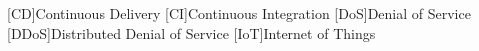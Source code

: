 \begin{acronym}[IEEE]
	[CD]{Continuous Delivery}
	[CI]{Continuous Integration}
	[DoS]{Denial of Service}
	[DDoS]{Distributed Denial of Service}
	[IoT]{Internet of Things}
\end{acronym}
